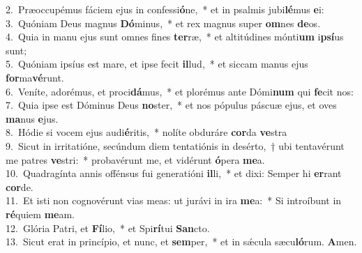 {2.~}Præoccupémus fáciem ejus in confessi\textbf{ó}ne,~* et in psalmis jubi\textbf{lé}mus \textbf{e}i:\\
{3.~}Quóniam Deus magnus \textbf{Dó}minus,~* et rex magnus super \textbf{om}nes \textbf{de}os.\\
{4.~}Quia in manu ejus sunt omnes fines \textbf{ter}ræ,~* et altitúdines mónti\textbf{um} i\textbf{psí}us sunt;\\
{5.~}Quóniam ipsíus est mare, et ipse fecit \textbf{il}lud,~* et siccam manus ejus \textbf{for}ma\textbf{vé}runt.\\
{6.~}Veníte, adorémus, et proci\textbf{dá}mus,~* et plorémus ante Dómi\textbf{num} qui \textbf{fe}cit nos:\\
{7.~}Quia ipse est Dóminus Deus \textbf{no}ster,~* et nos pópulus páscuæ ejus, et oves \textbf{ma}nus \textbf{e}jus.\\
{8.~}Hódie si vocem ejus audi\textbf{é}ritis,~* nolíte obduráre \textbf{cor}da \textbf{ve}stra\\
{9.~}Sicut in irritatióne, secúndum diem tentatiónis in desérto,~† ubi tentavérunt me patres \textbf{ve}stri:~* probavérunt me, et vidérunt \textbf{ó}pera \textbf{me}a.\\
{10.~}Quadragínta annis offénsus fui generatióni \textbf{il}li,~* et dixi: Semper hi \textbf{er}rant \textbf{cor}de.\\
{11.~}Et isti non cognovérunt vias meas: ut jurávi in ira \textbf{me}a:~* Si introíbunt in \textbf{ré}quiem \textbf{me}am.\\
{12.~}Glória Patri, et \textbf{Fí}lio,~* et Spi\textbf{rí}tui \textbf{San}cto.\\
{13.~}Sicut erat in princípio, et nunc, et \textbf{sem}per,~* et in sǽcula sæcu\textbf{ló}rum. \textbf{A}men.\\
